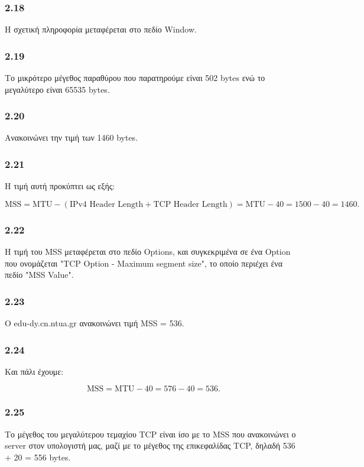 		\subsubsection*{2.18} 
			Η σχετική πληροφορία μεταφέρεται στο πεδίο Window.
		
		\subsubsection*{2.19} 
			Το μικρότερο μέγεθος παραθύρου που παρατηρούμε είναι 502 bytes ενώ το μεγαλύτερο είναι 65535 bytes.
		
		\subsubsection*{2.20} 
			Ανακοινώνει την τιμή των 1460 bytes.
		
		\subsubsection*{2.21} 
			Η τιμή αυτή προκύπτει ως εξής: 
			
			\[
				\text{MSS} = \text{MTU} - (\text{IPv4 Header Length} + \text{TCP Header Length}) = \text{MTU} - 40 = 1500 - 40 = 1460.
			\]
		
		\subsubsection*{2.22} 
			Η τιμή του MSS μεταφέρεται στο πεδίο Options, και συγκεκριμένα σε ένα Option που ονομάζεται "TCP Option - Maximum segment size", το οποίο περιέχει ένα πεδίο "MSS Value".
			
		\subsubsection*{2.23} 
			Ο edu-dy.cn.ntua.gr ανακοινώνει τιμή MSS = 536. 
			
		\subsubsection*{2.24} 
			Και πάλι έχουμε:
			
			\[
				\text{MSS} = \text{MTU} - 40 = 576 - 40 = 536.
			\]
				
		\subsubsection*{2.25} 
			Το μέγεθος του μεγαλύτερου τεμαχίου TCP είναι ίσο με το MSS που ανακοινώνει ο server στον υπολογιστή μας, μαζί με το μέγεθος της επικεφαλίδας TCP, δηλαδή 536 + 20 = 556 bytes.
		
